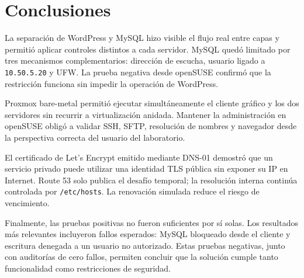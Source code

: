 \section{Conclusiones}

La separación de WordPress y MySQL hizo visible el flujo real entre capas y permitió aplicar controles distintos a cada servidor. MySQL quedó limitado por tres mecanismos complementarios: dirección de escucha, usuario ligado a \texttt{10.50.5.20} y UFW. La prueba negativa desde openSUSE confirmó que la restricción funciona sin impedir la operación de WordPress.

Proxmox bare-metal permitió ejecutar simultáneamente el cliente gráfico y los dos servidores sin recurrir a virtualización anidada. Mantener la administración en openSUSE obligó a validar SSH, SFTP, resolución de nombres y navegador desde la perspectiva correcta del usuario del laboratorio.

El certificado de Let's Encrypt emitido mediante DNS-01 demostró que un servicio privado puede utilizar una identidad TLS pública sin exponer su IP en Internet. Route 53 solo publica el desafío temporal; la resolución interna continúa controlada por \texttt{/etc/hosts}. La renovación simulada reduce el riesgo de vencimiento.

Finalmente, las pruebas positivas no fueron suficientes por sí solas. Los resultados más relevantes incluyeron fallos esperados: MySQL bloqueado desde el cliente y escritura denegada a un usuario no autorizado. Estas pruebas negativas, junto con auditorías de cero fallos, permiten concluir que la solución cumple tanto funcionalidad como restricciones de seguridad.
